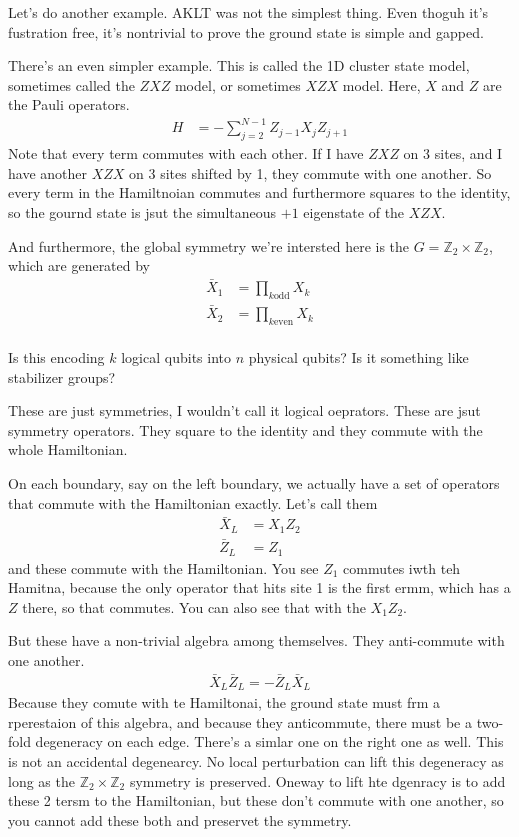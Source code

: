 Let's do another example.
AKLT was not the simplest thing.
Even thoguh it's fustration free,
it's nontrivial to prove the ground state is simple and gapped.

There's an even simpler example.
This is called the 1D cluster state model,
sometimes called the $ZXZ$ model,
or sometimes $XZX$ model.
Here, $X$ and $Z$ are the Pauli operators.
\begin{align}
    H &=
    -\sum_{j=2}^{N-1} Z_{j-1} X_j Z_{j+1}
\end{align}
Note that every term commutes with each other.
If I have $ZXZ$ on 3 sites,
and I have another $XZX$ on 3 sites shifted by 1,
they commute with one another.
So every term in the Hamiltnoian commutes and furthermore squares to the
identity,
so the gournd state is jsut the simultaneous $+1$ eigenstate of the $XZX$.

And furthermore,
the global symmetry we're intersted here is the
$G=\mathbb{Z}_2\times \mathbb{Z}_2$,
which are generated by
\begin{align}
    \bar{X}_1 &=
    \prod_{k\mathrm{ odd}} X_k\\
    \bar{X}_2 &=
    \prod_{k\mathrm{ even}} X_k\\
\end{align}


\begin{question}
    Is this encoding $k$ logical qubits into $n$ physical qubits?
    Is it something like stabilizer groups?
\end{question}
These are just symmetries,
I wouldn't call it logical oeprators.
These are jsut symmetry operators.
They square to the identity and they commute with the whole Hamiltonian.

On each boundary,
say on the left boundary,
we actually have a set of operators that commute with the Hamiltonian exactly.
Let's call them
\begin{align}
    \bar{X}_L &= X_1 Z_2\\
    \bar{Z}_L &= Z_1
\end{align}
and these commute with the Hamiltonian.
You see $Z_1$ commutes iwth teh Hamitna,
because the only operator that hits site 1 is the first ermm,
which has a $Z$ there, so that commutes.
You can also see that with the $X_1 Z_2$.

But these have a non-trivial algebra among themselves.
They anti-commute with one another.
\begin{align}
    \bar{X}_L \bar{Z}_L = - \bar{Z}_L \bar{X}_L
\end{align}
Because they comute with te Hamiltonai,
the ground state must frm a rperestaion of this algebra,
and because they anticommute,
there must be a two-fold degeneracy on each edge.
There's a simlar one on the right one as well.
This is not an accidental degenearcy.
No local perturbation can lift this degeneracy as long as the
$\mathbb{Z}_2\times \mathbb{Z}_2$ symmetry is preserved.
Oneway to lift hte dgenracy is to add these 2 tersm to the Hamiltonian,
but these don't commute with one another,
so you cannot add these both and preservet the symmetry.

